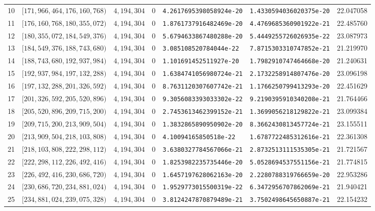 \documentclass[11pt]{article}
\newcommand{\1}{\mathbf 1}
\theoremstyle{plain}
\theoremstyle{definition}
\theoremstyle{remark}
\begin{document}
\begin{landscape}
\begin{longtable}{@{}r r r r l l r@{}}
10 & $[171,966,464,176,160,768)$ & $4,194,304$ & 0 & \texttt{4.2617695398058924e-20} & \texttt{1.4330594036020375e-20} & 22.047058\\
11 & $[176,160,768,180,355,072)$ & $4,194,304$ & 0 & \texttt{1.8761737916482469e-20} & \texttt{4.4769685360901922e-21} & 22.485760\\
12 & $[180,355,072,184,549,376)$ & $4,194,304$ & 0 & \texttt{5.6794633867480288e-20} & \texttt{5.4449255726026935e-22} & 23.087973\\
13 & $[184,549,376,188,743,680)$ & $4,194,304$ & 0 & \texttt{3.085108520784044e-22} & \texttt{7.8715303310747852e-21} & 21.219970\\
14 & $[188,743,680,192,937,984)$ & $4,194,304$ & 0 & \texttt{1.101691452511927e-20} & \texttt{1.7982910747464668e-20} & 21.240631\\
15 & $[192,937,984,197,132,288)$ & $4,194,304$ & 0 & \texttt{1.6384741056980724e-21} & \texttt{2.1732258914807476e-20} & 23.096198\\
16 & $[197,132,288,201,326,592)$ & $4,194,304$ & 0 & \texttt{8.7631120307607742e-21} & \texttt{1.1766250799413293e-20} & 22.451629\\
17 & $[201,326,592,205,520,896)$ & $4,194,304$ & 0 & \texttt{9.3056083393033302e-22} & \texttt{9.2190395910340208e-21} & 21.764466\\
18 & $[205,520,896,209,715,200)$ & $4,194,304$ & 0 & \texttt{2.7453613462399152e-21} & \texttt{1.3699056218129822e-21} & 23.099384\\
19 & $[209,715,200,213,909,504)$ & $4,194,304$ & 0 & \texttt{1.3832865890950902e-20} & \texttt{8.3662430813457724e-21} & 23.155511\\
20 & $[213,909,504,218,103,808)$ & $4,194,304$ & 0 & \texttt{4.10094165850518e-22} & \texttt{1.6787722485312616e-21} & 22.361308\\
21 & $[218,103,808,222,298,112)$ & $4,194,304$ & 0 & \texttt{3.6380327784567066e-21} & \texttt{2.8732513111535305e-21} & 21.721567\\
22 & $[222,298,112,226,492,416)$ & $4,194,304$ & 0 & \texttt{1.8253982235735446e-20} & \texttt{5.0528694537551156e-21} & 21.774815\\
23 & $[226,492,416,230,686,720)$ & $4,194,304$ & 0 & \texttt{1.6457197628062163e-20} & \texttt{2.2280788319766659e-20} & 22.953286\\
24 & $[230,686,720,234,881,024)$ & $4,194,304$ & 0 & \texttt{1.9529773015500319e-22} & \texttt{6.3472956707862069e-21} & 21.940421\\
25 & $[234,881,024,239,075,328)$ & $4,194,304$ & 0 & \texttt{3.8124247870879489e-21} & \texttt{3.7502498645650887e-21} & 22.154232\\

\end{longtable}
\end{landscape}
\end{document}
